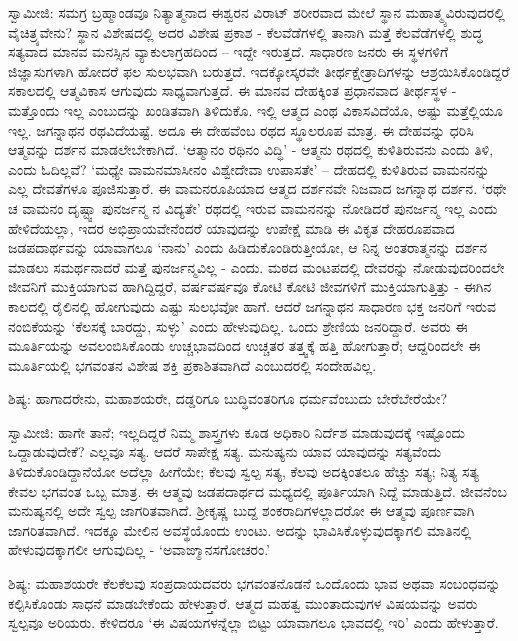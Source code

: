 ಸ್ವಾಮೀಜಿ: ಸಮಗ್ರ ಬ್ರಹ್ಮಾಂಡವೂ ನಿತ್ಯಾತ್ಮನಾದ ಈಶ್ವರನ ವಿರಾಟ್ ಶರೀರವಾದ ಮೇಲೆ ಸ್ಥಾನ ಮಹಾತ್ಮ್ಯವಿರುವುದರಲ್ಲಿ ವೈಚಿತ್ರ್ಯವೇನು? ಸ್ಥಾನ ವಿಶೇಷದಲ್ಲಿ ಅದರ ವಿಶೇಷ ಪ್ರಕಾಶ - ಕೆಲವೆಡೆಗಳಲ್ಲಿ ತಾನಾಗಿ ಮತ್ತೆ ಕೆಲವೆಡೆಗಳಲ್ಲಿ ಶುದ್ಧ ಸತ್ಯವಾದ ಮಾನವ ಮನಸ್ಸಿನ ವ್ಯಾಕುಲಾಗ್ರಹದಿಂದ – ಇದ್ದೇ ಇರುತ್ತದೆ. ಸಾಧಾರಣ ಜನರು ಈ ಸ್ಥಳಗಳಿಗೆ ಜಿಜ್ಞಾಸುಗಳಾಗಿ ಹೋದರೆ ಫಲ ಸುಲಭವಾಗಿ ಬರುತ್ತದೆ. ಇದಕ್ಕೋಸ್ಕರವೇ ತೀರ್ಥಕ್ಷೇತ್ರಾದಿಗಳನ್ನು ಆಶ್ರಯಿಸಿಕೊಂಡಿದ್ದರೆ ಸಕಾಲದಲ್ಲಿ ಆತ್ಮವಿಕಾಸ ಆಗುವುದು ಸಾಧ್ಯವಾಗುತ್ತದೆ. ಈ ಮಾನವ ದೇಹಕ್ಕಿಂತ ಪ್ರಧಾನವಾದ ತೀರ್ಥಸ್ಥಳ - ಮತ್ತೊಂದು ಇಲ್ಲ ಎಂಬುದನ್ನು ಖಂಡಿತವಾಗಿ ತಿಳಿದುಕೊ. ಇಲ್ಲಿ ಆತ್ಮದ ಎಂಥ ವಿಕಾಸವಿದೆಯೊ, ಅಷ್ಟು ಮತ್ತೆಲ್ಲಿಯೂ ಇಲ್ಲ. ಜಗನ್ನಾಥನ ರಥವಿದೆಯಷ್ಟೆ. ಅದೂ ಈ ದೇಹವೆಂಬ ರಥದ ಸ್ಥೂಲರೂಪ ಮಾತ್ರ. ಈ ದೇಹವನ್ನು ಧರಿಸಿ ಆತ್ಮವನ್ನು ದರ್ಶನ ಮಾಡಲೇಬೇಕಾಗಿದೆ. ‘ಆತ್ಮಾನಂ ರಥಿನಂ ವಿದ್ಧಿ’ - ಆತ್ಮನು ರಥದಲ್ಲಿ ಕುಳಿತಿರುವನು ಎಂದು ತಿಳಿ, ಎಂದು ಓದಿಲ್ಲವೆ? ‘ಮಧ್ಯೇ ವಾಮನಮಾಸೀನಂ ವಿಶ್ವೇದೇವಾ ಉಪಾಸತೇ’ – ದೇಹದಲ್ಲಿ ಕುಳಿತಿರುವ ವಾಮನನನ್ನು ಎಲ್ಲ ದೇವತೆಗಳೂ ಪೂಜಿಸುತ್ತಾರೆ. ಈ ವಾಮನರೂಪಿಯಾದ ಆತ್ಮದ ದರ್ಶನವೇ ನಿಜವಾದ ಜಗನ್ನಾಥ ದರ್ಶನ. ‘ರಥೇ ಚ ವಾಮನಂ ದೃಷ್ಟ್ವಾ ಪುನರ್ಜನ್ಮ ನ ವಿದ್ಯತೇ’ ರಥದಲ್ಲಿ ಇರುವ ವಾಮನನನ್ನು ನೋಡಿದರೆ ಪುನರ್ಜನ್ಮ ಇಲ್ಲ ಎಂದು ಹೇಳಿದೆಯಲ್ಲಾ, ಇದರ ಅಭಿಪ್ರಾಯವೇನೆಂದರೆ ಯಾವುದನ್ನು ಉಪೇಕ್ಷೆ ಮಾಡಿ ಈ ವಿಕೃತ ದೇಹರೂಪವಾದ ಜಡಪದಾರ್ಥವನ್ನು ಯಾವಾಗಲೂ ‘ನಾನು’ ಎಂದು ಹಿಡಿದುಕೊಂಡಿರುತ್ತೀಯೋ, ಆ ನಿನ್ನ ಅಂತರಾತ್ಮನನ್ನು ದರ್ಶನ ಮಾಡಲು ಸಮರ್ಥನಾದರೆ ಮತ್ತೆ ಪುನರ್ಜನ್ಮವಿಲ್ಲ - ಎಂದು. ಮಠದ ಮಂಟಪದಲ್ಲಿ ದೇವರನ್ನು ನೋಡುವುದರಿಂದಲೇ ಜೀವನಿಗೆ ಮುಕ್ತಿಯಾಗುವ ಹಾಗಿದ್ದಿದ್ದರೆ, ವರ್ಷವರ್ಷವೂ ಕೋಟಿ ಕೋಟಿ ಜೀವಗಳಿಗೆ ಮುಕ್ತಿಯಾಗುತ್ತಿತ್ತು - ಈಗಿನ ಕಾಲದಲ್ಲಿ ರೈಲಿನಲ್ಲಿ ಹೋಗುವುದು ಎಷ್ಟು ಸುಲಭವೋ ಹಾಗೆ. ಆದರೆ ಜಗನ್ನಾಥನ ಸಾಧಾರಣ ಭಕ್ತ ಜನರಿಗೆ ಇರುವ ನಂಬಿಕೆಯನ್ನು ‘ಕೆಲಸಕ್ಕೆ ಬಾರದ್ದು, ಸುಳ್ಳು’ ಎಂದು ಹೇಳುವುದಿಲ್ಲ. ಒಂದು ಶ್ರೇಣಿಯ ಜನರಿದ್ದಾರೆ. ಅವರು ಈ ಮೂರ್ತಿಯನ್ನು ಅವಲಂಬಿಸಿಕೊಂಡು ಉಚ್ಚಭಾವದಿಂದ ಉಚ್ಚತರ ತತ್ತ್ವಕ್ಕೆ ಹತ್ತಿ ಹೋಗುತ್ತಾರೆ; ಆದ್ದರಿಂದಲೇ ಈ ಮೂರ್ತಿಯಲ್ಲಿ ಭಗವಂತನ ವಿಶೇಷ ಶಕ್ತಿ ಪ್ರಕಾಶಿತವಾಗಿದೆ ಎಂಬುದರಲ್ಲಿ ಸಂದೇಹವಿಲ್ಲ.

ಶಿಷ್ಯ: ಹಾಗಾದರೇನು, ಮಹಾಶಯರೇ, ದಡ್ಡರಿಗೂ ಬುದ್ಧಿವಂತರಿಗೂ ಧರ್ಮವೆಂಬುದು ಬೇರೆಬೇರೆಯೇ?

ಸ್ವಾಮೀಜಿ: ಹಾಗೇ ತಾನೆ; ಇಲ್ಲದಿದ್ದರೆ ನಿಮ್ಮ ಶಾಸ್ತ್ರಗಳು ಕೂಡ ಅಧಿಕಾರಿ ನಿರ್ದೆಶ ಮಾಡುವುದಕ್ಕೆ ಇಷ್ಟೊಂದು ಒದ್ದಾಡುವುದೇಕೆ? ಎಲ್ಲವೂ ಸತ್ಯ. ಆದರೆ ಸಾಪೇಕ್ಷ ಸತ್ಯ. ಮನುಷ್ಯನು ಯಾವ ಯಾವುದನ್ನು ಸತ್ಯವೆಂದು ತಿಳಿದುಕೊಂಡಿದ್ದಾನೆಯೋ ಅದೆಲ್ಲಾ ಹೀಗೆಯೇ; ಕೆಲವು ಸ್ವಲ್ಪ ಸತ್ಯ, ಕೆಲವು ಅದಕ್ಕಿಂತಲೂ ಹೆಚ್ಚು ಸತ್ಯ; ನಿತ್ಯ ಸತ್ಯ ಕೇವಲ ಭಗವಂತ ಒಬ್ಬ ಮಾತ್ರ. ಈ ಆತ್ಮವು ಜಡಪದಾರ್ಥದ ಮಧ್ಯದಲ್ಲಿ ಪೂರ್ತಿಯಾಗಿ ನಿದ್ದೆ ಮಾಡುತ್ತಿದೆ. ಜೀವನೆಂಬ ಮನುಷ್ಯನಲ್ಲಿ ಅದೇ ಸ್ವಲ್ಪ ಜಾಗರಿತವಾಗಿದೆ. ಶ‍್ರೀಕೃಷ್ಣ ಬುದ್ದ ಶಂಕರಾದಿಗಳಲ್ಲಾದರೋ ಈ ಆತ್ಮವು ಪೂರ್ಣವಾಗಿ ಜಾಗರಿತವಾಗಿದೆ. ಇದಕ್ಕೂ ಮೇಲಿನ ಅವಸ್ಥೆಯೊಂದು ಉಂಟು. ಅದನ್ನು ಭಾವಿಸಿಕೊಳ್ಳುವುದಕ್ಕಾಗಲಿ ಮಾತಿನಲ್ಲಿ ಹೇಳುವುದಕ್ಕಾಗಲೀ ಆಗುವುದಿಲ್ಲ - ‘ಅವಾಙ್ಮಾನಸಗೋಚರಂ.’

ಶಿಷ್ಯ: ಮಹಾಶಯರೇ ಕೆಲಕೆಲವು ಸಂಪ್ರದಾಯದವರು ಭಗವಂತನೊಡನೆ ಒಂದೊಂದು ಭಾವ ಅಥವಾ ಸಂಬಂಧವನ್ನು ಕಲ್ಪಿಸಿಕೊಂಡು ಸಾಧನೆ ಮಾಡಬೇಕೆಂದು ಹೇಳುತ್ತಾರೆ. ಆತ್ಮದ ಮಹತ್ವ ಮುಂತಾದುವುಗಳ ವಿಷಯವನ್ನು ಅವರು ಸ್ವಲ್ಪವೂ ಅರಿಯರು. ಕೇಳಿದರೂ ‘ಈ ವಿಷಯಗಳನ್ನೆಲ್ಲಾ ಬಿಟ್ಟು ಯಾವಾಗಲೂ ಭಾವದಲ್ಲಿ ಇರಿ’ ಎಂದು ಹೇಳುತ್ತಾರೆ.

